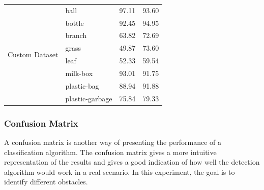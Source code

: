 \documentclass[sensors,article,submit,moreauthors,pdftex]{Definitions/mdpi}
\begin{document}
\begin{paracol}{2}
\begin{table}[htbp]
\begin{tabular}{llcc}
\multirow{8}{*}{Custom Dataset} 
& ball& 97.11  & 93.60 \\
& bottle & 92.45 & 94.95  \\
& branch & 63.82 & 72.69 \\
& grass & 49.87 & 73.60  \\
& leaf & 52.33 & 59.54 \\
& milk-box  & 93.01 & 91.75 \\
& plastic-bag & 88.94 & 91.88 \\
& plastic-garbage & 75.84 & 79.33 \\

\bottomrule
\end{tabular}
\label{tbl:Comparison of AP in different dataset}
\end{table}

\subsubsection{Confusion Matrix}
A confusion matrix is another way of presenting the performance of a classification algorithm. The confusion matrix gives a more intuitive representation of the results and gives a good indication of how well the detection algorithm would work in a real scenario. In this experiment, the goal is to identify different obstacles.


\end{paracol}
\end{document}
